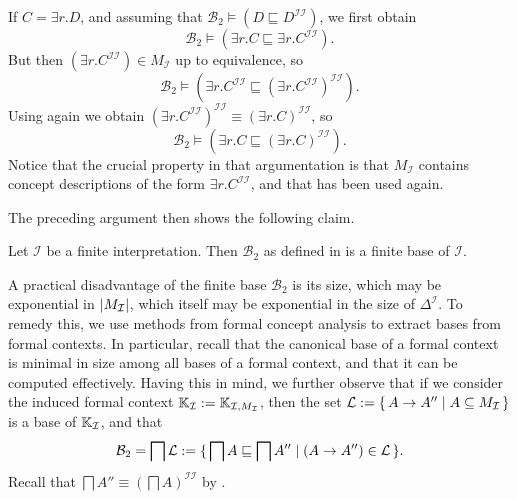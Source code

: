 If $C = \exists r. D$, and assuming that $\mathcal{B}_2 \models (D \sqsubseteq
D^{\mathcal{I}\mathcal{I}})$, we first obtain
\begin{equation}
  \label{eq:22}
  \mathcal{B}_2 \models ( \exists r. C \sqsubseteq \exists r. C^{\mathcal{I}\mathcal{I}} ).
\end{equation}
But then $(\exists r. C^{\mathcal{I}\mathcal{I}}) \in M_{\mathcal{I}}$ up to equivalence,
so
\begin{equation*}
  \mathcal{B}_2 \models ( \exists r. C^{\mathcal{I}\mathcal{I}} \sqsubseteq (\exists
  r.C^{\mathcal{I}\mathcal{I}})^{\mathcal{I}\mathcal{I}}).  
\end{equation*}
Using  again we obtain $(\exists
r. C^{\mathcal{I}\mathcal{I}})^{\mathcal{I}\mathcal{I}} \equiv (\exists
r. C)^{\mathcal{I}\mathcal{I}}$, so
\begin{equation*}
  \mathcal{B}_2 \models ( \exists r. C \sqsubseteq (\exists r. C)^{\mathcal{I}\mathcal{I}} ).
\end{equation*}
Notice that the crucial property in that argumentation is that $M_{\mathcal{I}}$ contains
concept descriptions of the form $\exists r. C^{\mathcal{I}\mathcal{I}}$, and that
 has been used again.

The preceding argument then shows the following claim.

\begin{Theorem}
  \label{thm:Felix-base-B2}
  Let $\mathcal{I}$ be a finite interpretation.  Then $\mathcal{B}_2$ as defined in
   is a finite base of $\mathcal{I}$.
\end{Theorem}

A practical disadvantage of the finite base $\mathcal{B}_2$ is its size, which may be
exponential in $\lvert M_{\mathcal{I}} \rvert$, which itself may be exponential in the size of
$\Delta^{\mathcal{I}}$.  To remedy this, we use methods from formal concept analysis to
extract bases from formal contexts.  In particular, recall that the canonical base of a
formal context is minimal in size among all bases of a formal context, and that it can be
computed effectively.  Having this in mind, we further observe that if we consider the
induced formal context ${\mathbb{K}}_{\mathcal{I}} := {\mathbb{K}}_{\mathcal{I}, M_{\mathcal{I}}}$,
then the set $\mathcal{L} := {\{\, A \to A'' \mid A \subseteq M_{\mathcal{I}} \,\}}$ is a base
of ${\mathbb{K}}_{\mathcal{I}}$, and that
\begin{equation*}
  \mathcal{B}_2 = \bigsqcap \mathcal{L} := {\{\, \bigsqcap A \sqsubseteq \bigsqcap A''
    \mid (A \to A'') \in \mathcal{L} \,\}}.
\end{equation*}
Recall that $\bigsqcap A'' \equiv (\bigsqcap A)^{\mathcal{I}\mathcal{I}}$ by
.

